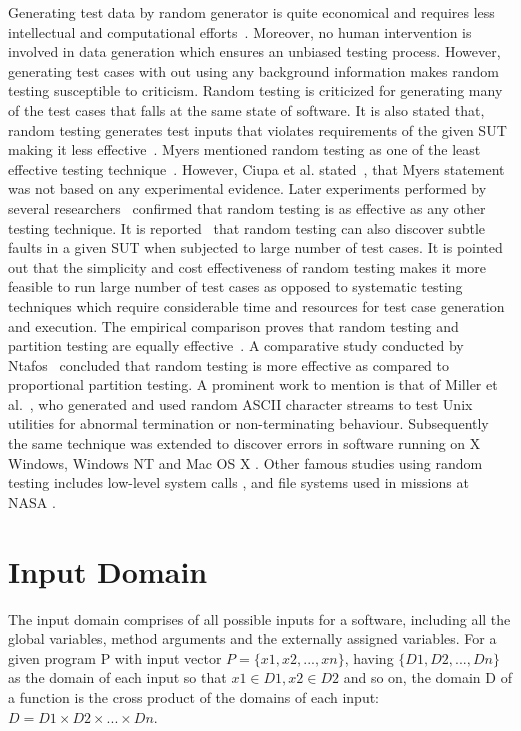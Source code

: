 Generating test data by random generator is quite economical and requires less intellectual and computational efforts~\cite{ciupa2008artoo}. Moreover, no human intervention is involved in data generation which ensures an unbiased testing process. However, generating test cases with out using any background information makes random testing susceptible to criticism. Random testing is criticized for generating many of the test cases that falls at the same state of software. It is also stated that, random testing generates test inputs that violates requirements of the given SUT making it less effective~\cite{pacheco2009directed, sen2007effective}. Myers mentioned random testing as one of the least effective testing technique~\cite{myers2011art}. However, Ciupa et al. stated~\cite{ciupa2007experimental}, that Myers statement was not based on any experimental evidence. Later experiments performed by several researchers~\cite{ciupa2008finding, hamlet1994random,  leitner2007efficient, duran1981report} confirmed that random testing is as effective as any other testing technique. It is reported~\cite{duran1981report} that random testing can also discover subtle faults in a given SUT when subjected to large number of test cases. It is pointed out that the simplicity and cost effectiveness of random testing makes it more feasible to run large number of test cases as opposed to systematic testing techniques which require considerable time and resources for test case generation and execution. The empirical comparison proves that random testing and partition testing are equally effective~\cite{hamlet1990partition}. A comparative study conducted by Ntafos~\cite{ntafos1998random} concluded that random testing is more effective as compared to proportional partition testing. A prominent work to mention is that of Miller et al.~\cite{miller1990empirical}, who generated and used random ASCII character streams to test Unix utilities for abnormal termination or non-terminating behaviour. Subsequently the same technique was extended to discover errors in software running on X Windows, Windows NT and Mac OS X \cite{forrester2000empirical, miller2006empirical}. Other famous studies using random testing includes low-level system calls \cite{kropp1998automated}, and file systems used in missions at NASA \cite{groce2007randomized}.


\section{Input Domain} 
The input domain comprises of all possible inputs for a software, including all the global variables, method arguments and the externally assigned variables. For a given program P with input vector $ P =\{x1, x2, . . . , xn\}$, having $\{D1, D2, . . . , Dn\}$ as the domain of each input so that $x1 \in D1, x2 \in D2$ and so on, the domain D of a function is the cross product of the domains of each input: $D = D1 \times D2 \times . . . \times Dn$.

